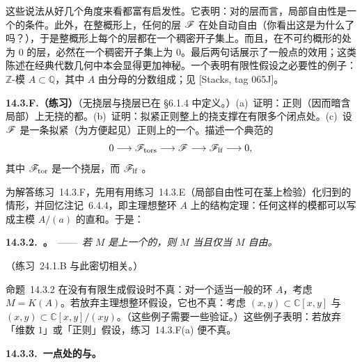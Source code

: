 这些说法从好几个角度来看都富有启发性。它表明：对\trFinitelyPresented{}的层而言，局部自由性是一个\trStalkLocal{}的条件。此外，在整概形上，任何\trFinitelyPresented{}的层 $\mathscr{F}$ 在\trGenericPoint{}处自动自由（你看出这是为什么了吗？），于是整概形上每个\trFinitelyPresented{}的层都在一个稠密开子集上\trLocallyFree。而且，在不可约概形的\trGenericPoint{}处为 $0$ 的\trFinitelyPresented{}层，必然在一个稠密开子集上为 $0$。最后两句话展示了一般点的效用；这类陈述在经典代数几何中本会显得更加神秘。一个表明有限性假设之必要性的例子：$\mathbb{Z}$-模 $A\subset\mathbb{Q}$，其中 $A$ 由分母\trSquareFree{}的分数组成；见 [Stacks, tag 065J]。

\textbf{14.3.F.（练习）}\quad （无挠层与挠层已在 \S6.1.4 中定义。）(a)~证明：正则（因而暗含局部\trNoetherian）\trCurve{}上无挠的\trCoherentSheaf{}都\trLocallyFree。(b)~证明：拟紧正则整\trCurve{}上的挠\trCoherentSheaf{}支撑在有限多个闭点处。(c)~设 $\mathscr{F}$ 是一条拟紧（为方便起见）正则\trCurve{}上的一个\trCoherentSheaf。描述一个典范的\trShortExactSequence
\[
0\longrightarrow\mathscr{F}_{\mathrm{tors}}\longrightarrow\mathscr{F}\longrightarrow\mathscr{F}_{\mathrm{lf}}\longrightarrow 0,
\]
其中 $\mathscr{F}_{\mathrm{tor}}$ 是一个挠层，而 $\mathscr{F}_{\mathrm{lf}}$ \trLocallyFree。

为解答\mbox{练习~14.3.F}，先用有用\mbox{练习~14.3.E}（局部自由性可在茎上检验）化归到\trDVR{}的情形，并回忆注记~6.4.4，即主理想整环 $A$ 上\trFinitelyGenerated{}\trModule{}的结构定理：任何这样的模都可以写成主模 $A/(a)$ 的直和。于是：

\textbf{14.3.2.\ \trhProposition{}。}\ ——\ \emph{若 $M$ 是\trPID{}上一个\trFinitelyGenerated{}的\trModule，则 $M$ \trTorsionFree{}当且仅当 $M$ 自由。}

（\mbox{练习~24.1.B} 与此密切相关。）

命题~14.3.2 在没有有限生成假设时不真：对一个适当一般的环 $A$，考虑 $M=K(A)$。若放弃主理想整环假设，它也不真：考虑 $(x,y)\subset\mathbb{C}[x,y]$ 与 $(x,y)\subset\mathbb{C}[x,y]/(xy)$。（这些例子需要一些验证。）这些例子表明：若放弃「维数 $1$」或「正则」假设，\mbox{练习~14.3.F(a)} 便不真。

\textbf{14.3.3.\ 一点处\trQCSheaf{}的\trFiber{}与\trRank。}

